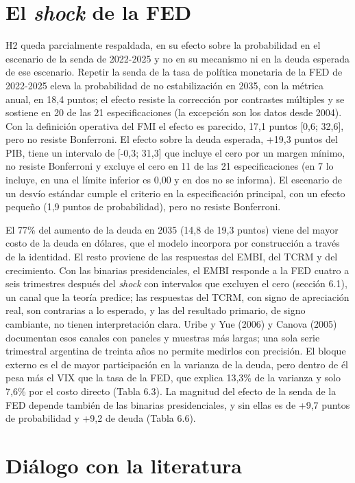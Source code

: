 \section{\texorpdfstring{El \emph{shock} de la FED}{El shock de la FED}}

H2 queda parcialmente respaldada, en su efecto sobre la probabilidad en
el escenario de la senda de 2022-2025 y no en su mecanismo ni en la
deuda esperada de ese escenario. Repetir la senda de la tasa de política
monetaria de la FED de 2022-2025 eleva la probabilidad de no
estabilización en 2035, con la métrica anual, en 18,4 puntos; el efecto
resiste la corrección por contrastes múltiples y se sostiene en 20 de
las 21 especificaciones (la excepción son los datos desde 2004). Con la
definición operativa del FMI el efecto es parecido, 17,1 puntos {[}0,6;
32,6{]}, pero no resiste Bonferroni. El efecto sobre la deuda esperada,
+19,3 puntos del PIB, tiene un intervalo de {[}-0,3; 31,3{]} que incluye
el cero por un margen mínimo, no resiste Bonferroni y excluye el cero en
11 de las 21 especificaciones (en 7 lo incluye, en una el límite
inferior es 0,00 y en dos no se informa). El escenario de un desvío
estándar cumple el criterio en la especificación principal, con un
efecto pequeño (1,9 puntos de probabilidad), pero no resiste Bonferroni.

El 77\% del aumento de la deuda en 2035 (14,8 de 19,3 puntos) viene del
mayor costo de la deuda en dólares, que el modelo incorpora por
construcción a través de la identidad. El resto proviene de las
respuestas del EMBI, del TCRM y del crecimiento. Con las binarias
presidenciales, el EMBI responde a la FED cuatro a seis trimestres
después del \emph{shock} con intervalos que excluyen el cero (sección
6.1), un canal que la teoría predice; las respuestas del TCRM, con signo
de apreciación real, son contrarias a lo esperado, y las del resultado
primario, de signo cambiante, no tienen interpretación clara. Uribe y
Yue (2006) y Canova (2005) documentan esos canales con paneles y
muestras más largas; una sola serie trimestral argentina de treinta años
no permite medirlos con precisión. El bloque externo es el de mayor
participación en la varianza de la deuda, pero dentro de él pesa más el
VIX que la tasa de la FED, que explica 13,3\% de la varianza y solo
7,6\% por el costo directo (Tabla 6.3). La magnitud del efecto de la
senda de la FED depende también de las binarias presidenciales, y sin
ellas es de +9,7 puntos de probabilidad y +9,2 de deuda (Tabla 6.6).

\section{Diálogo con la literatura}

